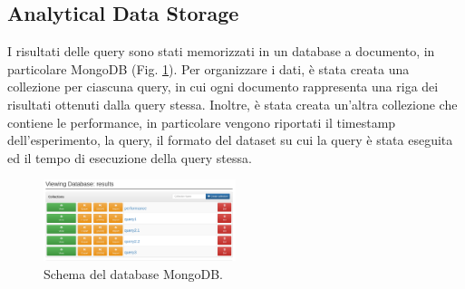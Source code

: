 \documentclass[conference]{IEEEtran}
\begin{document}
\subsection{Analytical Data Storage}
I risultati delle query sono stati memorizzati in un database a documento, in particolare MongoDB (Fig. \ref{fig:mongo}).
Per organizzare i dati, è stata creata una collezione per ciascuna query, in cui ogni documento rappresenta una riga dei risultati ottenuti dalla query stessa. Inoltre, è stata creata un'altra collezione che contiene le performance, in particolare vengono riportati il timestamp dell'esperimento, la query, il formato del dataset su cui la query è stata eseguita ed il tempo di esecuzione della query stessa.
\begin{figure}[H]
    \centerline{\includegraphics[width=0.5\textwidth]{res/mongo.png}}
    \caption{Schema del database MongoDB.}
    \label{fig:mongo}
\end{figure}
\end{document}
